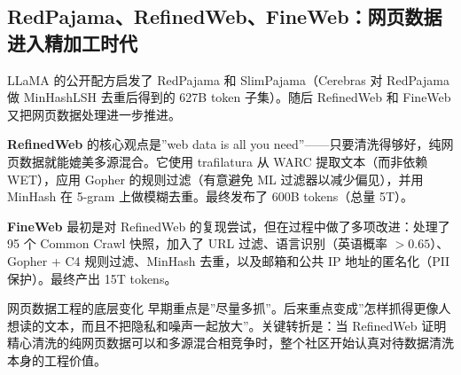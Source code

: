 \subsection{RedPajama、RefinedWeb、FineWeb：网页数据进入精加工时代}

LLaMA 的公开配方启发了 RedPajama 和 SlimPajama（Cerebras 对 RedPajama 做 MinHashLSH 去重后得到的 627B token 子集）。随后 RefinedWeb 和 FineWeb 又把网页数据处理进一步推进。

\textbf{RefinedWeb} 的核心观点是”web data is all you need”——只要清洗得够好，纯网页数据就能媲美多源混合。它使用 trafilatura 从 WARC 提取文本（而非依赖 WET），应用 Gopher 的规则过滤（有意避免 ML 过滤器以减少偏见），并用 MinHash 在 5-gram 上做模糊去重。最终发布了 600B tokens（总量 5T）。

\textbf{FineWeb} 最初是对 RefinedWeb 的复现尝试，但在过程中做了多项改进：处理了 95 个 Common Crawl 快照，加入了 URL 过滤、语言识别（英语概率 $> 0.65$）、Gopher + C4 规则过滤、MinHash 去重，以及邮箱和公共 IP 地址的匿名化（PII 保护）。最终产出 15T tokens。

\begin{importantbox}{网页数据工程的底层变化}
早期重点是”尽量多抓”。后来重点变成”怎样抓得更像人想读的文本，而且不把隐私和噪声一起放大”。关键转折是：当 RefinedWeb 证明精心清洗的纯网页数据可以和多源混合相竞争时，整个社区开始认真对待数据清洗本身的工程价值。
\end{importantbox}

